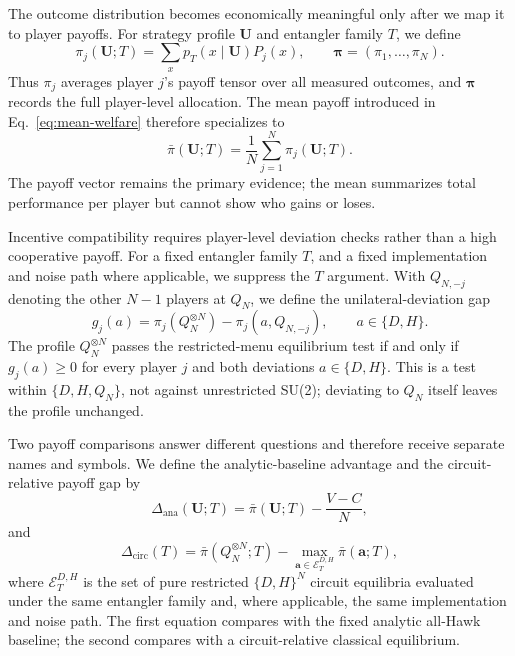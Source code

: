 \documentclass[conference,letterpaper,10pt]{IEEEtran}
\begin{document}
The outcome distribution becomes economically meaningful only after we map it
to player payoffs. For strategy profile $\boldsymbol U$ and entangler family
$T$, we define
\begin{equation}
\pi_j(\boldsymbol U;T)
=\sum_x p_T(x\mid\boldsymbol U)P_j(x),
\qquad
\boldsymbol\pi=(\pi_1,\ldots,\pi_N).
\label{eq:expected-payoff-vector}
\end{equation}
Thus $\pi_j$ averages player $j$'s payoff tensor over all measured outcomes,
and $\boldsymbol\pi$ records the full player-level allocation. The mean payoff
introduced in Eq.~\eqref{eq:mean-welfare} therefore specializes to
\begin{equation}
\bar\pi(\boldsymbol U;T)
=\frac{1}{N}\sum_{j=1}^{N}\pi_j(\boldsymbol U;T).
\label{eq:mean-payoff}
\end{equation}
The payoff vector remains the primary evidence; the mean summarizes total
performance per player but cannot show who gains or loses.

Incentive compatibility requires player-level deviation checks rather than a
high cooperative payoff. For a fixed entangler family $T$, and a fixed
implementation and noise path where applicable, we suppress the $T$ argument.
With $Q_{N,-j}$ denoting the other $N-1$ players at $Q_N$, we define the
unilateral-deviation gap
\begin{equation}
g_j(a)
=\pi_j(Q_N^{\otimes N})
-\pi_j(a,Q_{N,-j}),
\qquad a\in\{D,H\}.
\label{eq:deviation-gap}
\end{equation}
The profile $Q_N^{\otimes N}$ passes the restricted-menu equilibrium test if
and only if $g_j(a)\geq0$ for every player $j$ and both deviations
$a\in\{D,H\}$. This is a test within $\{D,H,Q_N\}$, not against unrestricted
SU(2); deviating to $Q_N$ itself leaves the profile unchanged.

Two payoff comparisons answer different questions and therefore receive
separate names and symbols. We define the analytic-baseline advantage and the
circuit-relative payoff gap by
\begin{equation}
\Delta_{\mathrm{ana}}(\boldsymbol U;T)
=\bar\pi(\boldsymbol U;T)-\frac{V-C}{N},
\label{eq:analytic-advantage}
\end{equation}
and
\begin{equation}
\Delta_{\mathrm{circ}}(T)
=\bar\pi(Q_N^{\otimes N};T)
-\max_{\boldsymbol a\in\mathcal E_T^{D,H}}
 \bar\pi(\boldsymbol a;T),
\label{eq:circuit-payoff-gap}
\end{equation}
where $\mathcal E_T^{D,H}$ is the set of pure restricted $\{D,H\}^N$ circuit
equilibria evaluated under the same entangler family and, where applicable,
the same implementation and noise path. The first equation compares with the
fixed analytic all-Hawk baseline; the second compares with a circuit-relative
classical equilibrium.
\end{document}
